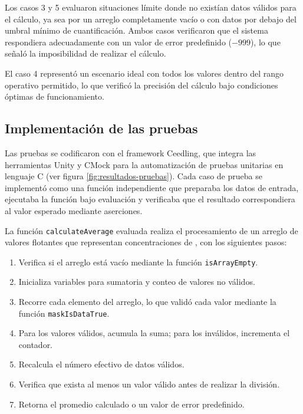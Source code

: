 Los casos 3 y 5 evaluaron situaciones límite donde no existían datos válidos para el cálculo, ya sea por un arreglo completamente vacío o con datos por debajo del umbral mínimo de cuantificación. Ambos casos verificaron que el sistema respondiera adecuadamente con un valor de error predefinido ($-999$), lo que señaló la imposibilidad de realizar el cálculo.

El caso 4 representó un escenario ideal con todos los valores dentro del rango operativo permitido, lo que verificó la precisión del cálculo bajo condiciones óptimas de funcionamiento.

\subsection{Implementación de las pruebas}

Las pruebas se codificaron con el framework Ceedling, que integra las herramientas Unity y CMock para la automatización de pruebas unitarias en lenguaje C (ver figura \ref{fig:resultados-pruebas}). Cada caso de prueba se implementó como una función independiente que preparaba los datos de entrada, ejecutaba la función bajo evaluación y verificaba que el resultado correspondiera al valor esperado mediante aserciones.

La función \texttt{calculateAverage} evaluada realiza el procesamiento de un arreglo de valores flotantes que representan concentraciones de \MPF, con los siguientes pasos:

\begin{enumerate}
	\item Verifica si el arreglo está vacío mediante la función \texttt{isArrayEmpty}.
	\item Inicializa variables para sumatoria y conteo de valores no válidos.
	\item Recorre cada elemento del arreglo, lo que validó cada valor mediante la función \texttt{maskIsDataTrue}.
	\item Para los valores válidos, acumula la suma; para los inválidos, incrementa el contador.
	\item Recalcula el número efectivo de datos válidos.
	\item Verifica que exista al menos un valor válido antes de realizar la división.
	\item Retorna el promedio calculado o un valor de error predefinido.
\end{enumerate}

